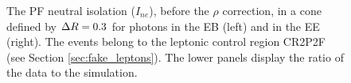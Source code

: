 \begin{figure}
  \centering
  \hfill
  \hfill
  \hfill\mbox{}
\caption{The PF neutral isolation ($I_{ne}$), before the $\rho$ correction, in a cone defined by $\Delta R = 0.3$ for photons in the EB (left) and in the EE (right).
The events belong to the leptonic control region CR2P2F (see Section \ref{sec:fake_leptons}).
The lower panels display the ratio of the data to the simulation.}
\label{fig:neIso_CR2P2F}
\end{figure}

